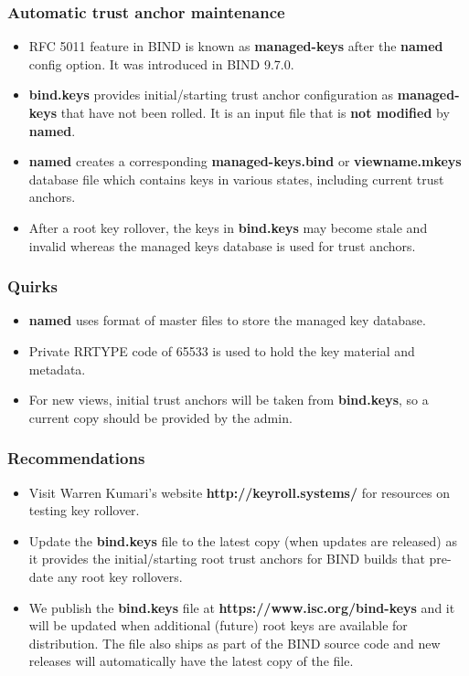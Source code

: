 \documentclass{beamer}
\begin{document}
\frame
{
  \frametitle{Automatic trust anchor maintenance}

  \begin{itemize}

  \item RFC 5011 feature in BIND is known as \textbf{managed-keys} after
    the \textbf{named} config option. It was introduced in BIND 9.7.0.

  \item \textbf{bind.keys} provides initial/starting trust anchor
    configuration as \textbf{managed-keys} that have not been rolled. It
    is an input file that is \textbf{not modified} by \textbf{named}.

  \item \textbf{named} creates a corresponding
    \textbf{managed-keys.bind} or \textbf{viewname.mkeys} database file
    which contains keys in various states, including current trust
    anchors.

  \item After a root key rollover, the keys in \textbf{bind.keys} may
    become stale and invalid whereas the managed keys database is used
    for trust anchors.

  \end{itemize}
}

\frame
{
  \frametitle{Quirks}

  \begin{itemize}
    \item \textbf{named} uses format of master files to store the
      managed key database.
    \item Private RRTYPE code of 65533 is used to hold the key material
      and metadata.
    \item For new views, initial trust anchors will be taken from
      \textbf{bind.keys}, so a current copy should be provided by the
      admin.
  \end{itemize}
}

\frame
{
  \frametitle{Recommendations}

  \begin{itemize}
  \item Visit Warren Kumari's website \textbf{http://keyroll.systems/}
    for resources on testing key rollover.

  \item Update the \textbf{bind.keys} file to the latest copy (when
    updates are released) as it provides the initial/starting root trust
    anchors for BIND builds that pre-date any root key rollovers.

  \item We publish the \textbf{bind.keys} file at
    \textbf{https://www.isc.org/bind-keys} and it will be updated when
    additional (future) root keys are available for distribution. The
    file also ships as part of the BIND source code and new releases
    will automatically have the latest copy of the file.
  \end{itemize}

}
\end{document}
